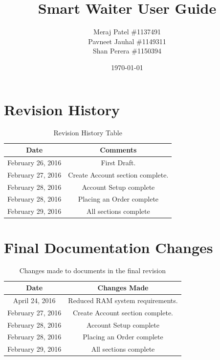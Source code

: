 \documentclass[12pt, titlepage]{article}
\begin{document}
\title{Smart Waiter User Guide} 
\author{Meraj Patel \#1137491 \\ Pavneet Jauhal \#1149311\\ Shan Perera \#1150394}
\date{\today}
\maketitle

\tableofcontents 

\listoftables

\begin{table}[H]
\section*{Revision History}
\begin{tabular}{|c|c|}
\hline
\textbf{Date}  & \textbf{Comments} \\ \hline
February 26, 2016 &  First Draft. \\ 
\hline
February 27, 2016 & Create Account section complete. \\
\hline
February 28, 2016 & Account Setup complete \\
\hline
February 28, 2016 & Placing an Order complete \\
\hline
February 29, 2016 & All sections complete \\
\hline
\end{tabular}
\caption{Revision History Table}
\end{table}

\begin{table}[H]
\section*{Final Documentation Changes}
\begin{tabular}{|c|c|}
\hline
\textbf{Date}  & \textbf{Changes Made} \\ \hline
April 24, 2016 &  Reduced RAM system requirements. \\ 
\hline
February 27, 2016 & Create Account section complete. \\
\hline
February 28, 2016 & Account Setup complete \\
\hline
February 28, 2016 & Placing an Order complete \\
\hline
February 29, 2016 & All sections complete \\
\hline
\end{tabular}
\caption{Changes made to documents in the final revision}
\end{table}
\end{document}
